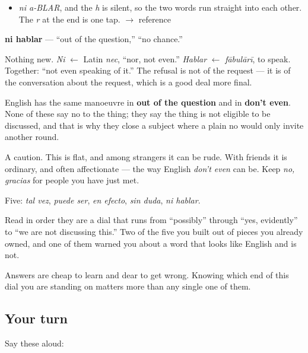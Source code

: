 \begin{sounds}
\begin{itemize}
\raggedright
  \item \emph{ni a-BLAR}, and the \emph{h} is silent, so the two words run straight into each other. The \emph{r} at the end is one tap. $\to$ reference
\end{itemize}
\end{sounds}

\begin{cousinweb}
\textbf{ni hablar} — \textquotedblleft{}out of the question,\textquotedblright{} \textquotedblleft{}no chance.\textquotedblright{}

Nothing new. \emph{Ni} $\leftarrow$ Latin \emph{nec}, \textquotedblleft{}nor, not even.\textquotedblright{} \emph{Hablar} $\leftarrow$ \emph{fābulārī}, to speak. Together: \textquotedblleft{}not even speaking of it.\textquotedblright{} The refusal is not of the request — it is of the conversation about the request, which is a good deal more final.

English has the same manoeuvre in \textbf{out of the question} and in \textbf{don't even}. None of these say no to the thing; they say the thing is not eligible to be discussed, and that is why they close a subject where a plain no would only invite another round.

A caution. This is flat, and among strangers it can be rude. With friends it is ordinary, and often affectionate — the way English \emph{don't even} can be. Keep \emph{no, gracias} for people you have just met.
\end{cousinweb}

\begin{grammarlens}[title={What you've built}]
Five: \emph{tal vez}, \emph{puede ser}, \emph{en efecto}, \emph{sin duda}, \emph{ni hablar}.

Read in order they are a dial that runs from \textquotedblleft{}possibly\textquotedblright{} through \textquotedblleft{}yes, evidently\textquotedblright{} to \textquotedblleft{}we are not discussing this.\textquotedblright{} Two of the five you built out of pieces you already owned, and one of them warned you about a word that looks like English and is not.

Answers are cheap to learn and dear to get wrong. Knowing which end of this dial you are standing on matters more than any single one of them.
\end{grammarlens}

\subsection*{Your turn}
Say these aloud:

